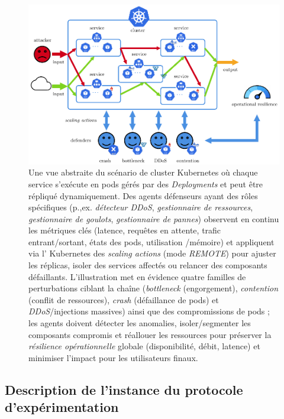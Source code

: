 \begin{figure}[h!]
  \centering
  \hspace{-0.4cm}
  \includegraphics[trim=0cm 0cm 0cm 0cm, clip, width=\textwidth]{figures/scenario_introduction.pdf}
  \caption[Une vue abstraite du scénario de cluster Kubernetes]{Une vue abstraite du scénario de cluster Kubernetes où chaque service s'exécute en pods gérés par des \textit{Deployments} et peut être répliqué dynamiquement. Des agents défenseurs ayant des rôles spécifiques (p.,ex. \textit{détecteur DDoS}, \textit{gestionnaire de ressources}, \textit{gestionnaire de goulots}, \textit{gestionnaire de pannes}) observent en continu les métriques clés (latence, requêtes en attente, trafic entrant/sortant, états des pods, utilisation /mémoire) et appliquent via l' Kubernetes des \textit{scaling actions} (mode \textit{REMOTE}) pour ajuster les réplicas, isoler des services affectés ou relancer des composants défaillants. L'illustration met en évidence quatre familles de perturbations ciblant la chaîne (\textit{bottleneck} (engorgement), \textit{contention} (conflit de ressources), \textit{crash} (défaillance de pods) et \textit{DDoS}/injections massives) ainsi que des compromissions de pods ; les agents doivent détecter les anomalies, isoler/segmenter les composants compromis et réallouer les ressources pour préserver la \textit{résilience opérationnelle} globale (disponibilité, débit, latence) et minimiser l'impact pour les utilisateurs finaux.}
  \label{fig:k8s_cluster_graph_intro}
\end{figure}


\subsection{Description de l'instance du protocole d'expérimentation}

